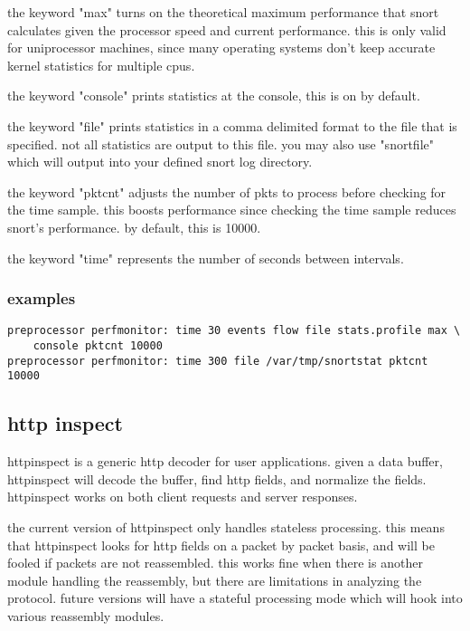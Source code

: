 \documentclass[english]{report}
\begin{document}
the keyword "max" turns on the theoretical maximum performance that snort
calculates given the processor speed and current performance.  this is only
valid for uniprocessor machines, since many operating systems don't keep
accurate kernel statistics for multiple cpus.  

the keyword "console" prints statistics at the console, this is on by default.  

the keyword "file" prints statistics in a comma delimited format to the file
that is specified.  not all statistics are output to this file.  you may also
use "snortfile" which will output into your defined snort log directory.  

the keyword "pktcnt" adjusts the number of pkts to process before checking for
the time sample.  this boosts performance since checking the time sample
reduces snort's performance.  by default, this is 10000.  

the keyword "time" represents the number of seconds between intervals.

\subsubsection{examples}

\begin{verbatim}
preprocessor perfmonitor: time 30 events flow file stats.profile max \
    console pktcnt 10000 
preprocessor perfmonitor: time 300 file /var/tmp/snortstat pktcnt 10000
\end{verbatim}

\subsection{http inspect \label{sub:http-inspect}}

httpinspect is a generic http decoder for user applications.  given a data
buffer, httpinspect will decode the buffer, find http fields, and normalize the
fields.  httpinspect works on both client requests and server responses.

the current version of httpinspect only handles stateless processing.  this
means that httpinspect looks for http fields on a packet by packet basis, and
will be fooled if packets are not reassembled.  this works fine when there is
another module handling the reassembly, but there are limitations in analyzing
the protocol.  future versions will have a stateful processing mode which will
hook into various reassembly modules.
\end{document}
